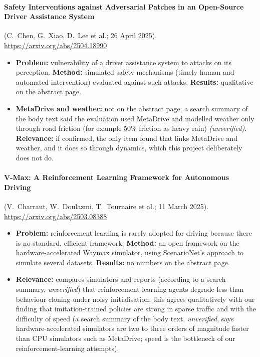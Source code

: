 \paragraph{Safety Interventions against Adversarial Patches in an Open-Source Driver Assistance System} (C.~Chen, G.~Xiao, D.~Lee et al.; 26 April 2025). \url{https://arxiv.org/abs/2504.18990}
\begin{itemize}
\item \textbf{Problem:} vulnerability of a driver assistance system to attacks on its perception. \textbf{Method:} simulated safety mechanisms (timely human and automated intervention) evaluated against such attacks. \textbf{Results:} qualitative on the abstract page.
\item \textbf{MetaDrive and weather:} not on the abstract page; a search summary of the body text said the evaluation used MetaDrive and modelled weather only through road friction (for example 50\% friction as heavy rain) \emph{(unverified)}. \textbf{Relevance:} if confirmed, the only item found that links MetaDrive and weather, and it does so through dynamics, which this project deliberately does not do.
\end{itemize}

\paragraph{V-Max: A Reinforcement Learning Framework for Autonomous Driving} (V.~Charraut, W.~Doulazmi, T.~Tournaire et al.; 11 March 2025). \url{https://arxiv.org/abs/2503.08388}
\begin{itemize}
\item \textbf{Problem:} reinforcement learning is rarely adopted for driving because there is no standard, efficient framework. \textbf{Method:} an open framework on the hardware-accelerated Waymax simulator, using ScenarioNet's approach to simulate several datasets. \textbf{Results:} no numbers on the abstract page.
\item \textbf{Relevance:} compares simulators and reports (according to a search summary, \emph{unverified}) that reinforcement-learning agents degrade less than behaviour cloning under noisy initialisation; this agrees qualitatively with our finding that imitation-trained policies are strong in sparse traffic and with the difficulty of speed (a search summary of the body text, \emph{unverified}, says hardware-accelerated simulators are two to three orders of magnitude faster than CPU simulators such as MetaDrive; speed is the bottleneck of our reinforcement-learning attempts).
\end{itemize}


